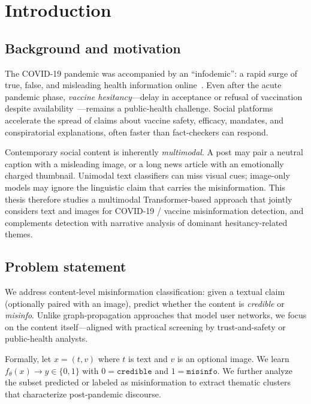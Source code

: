 \chapter{Introduction}
\label{ch:intro}

\section{Background and motivation}

The COVID-19 pandemic was accompanied by an ``infodemic'': a rapid surge of true, false, and misleading health information online~\cite{who2020infodemic}.
Even after the acute pandemic phase, \emph{vaccine hesitancy}---delay in acceptance or refusal of vaccination despite availability~\cite{macdonald2015hesitancy}---remains a public-health challenge.
Social platforms accelerate the spread of claims about vaccine safety, efficacy, mandates, and conspiratorial explanations, often faster than fact-checkers can respond.

Contemporary social content is inherently \emph{multimodal}.
A post may pair a neutral caption with a misleading image, or a long news article with an emotionally charged thumbnail.
Unimodal text classifiers can miss visual cues; image-only models may ignore the linguistic claim that carries the misinformation.
This thesis therefore studies a multimodal Transformer-based approach that jointly considers text and images for COVID-19 / vaccine misinformation detection, and complements detection with narrative analysis of dominant hesitancy-related themes.

\section{Problem statement}

We address content-level misinformation classification:
given a textual claim (optionally paired with an image), predict whether the content is \emph{credible} or \emph{misinfo}.
Unlike graph-propagation approaches that model user networks, we focus on the content itself---aligned with practical screening by trust-and-safety or public-health analysts.

Formally, let $x = (t, v)$ where $t$ is text and $v$ is an optional image.
We learn $f_\theta(x) \rightarrow y \in \{0,1\}$ with $0=\texttt{credible}$ and $1=\texttt{misinfo}$.
We further analyze the subset predicted or labeled as misinformation to extract thematic clusters that characterize post-pandemic discourse.

